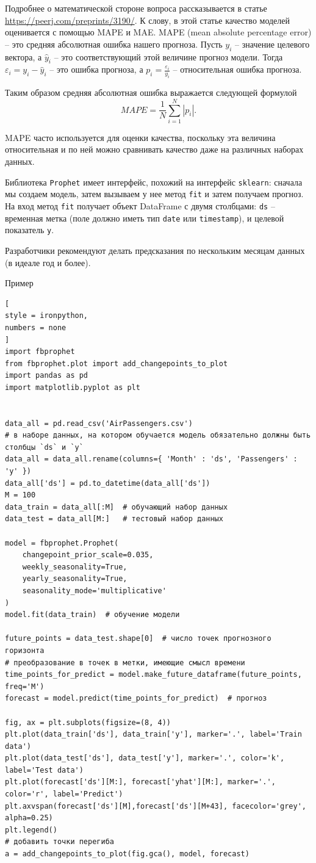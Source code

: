 \documentclass[%
	11pt,
	a4paper,
	utf8,
		]{article}
\begin{document}
Подробнее о математической стороне вопроса рассказывается в статье \url{https://peerj.com/preprints/3190/}. К слову, в этой статье качество моделей оценивается с помощью MAPE и MAE. MAPE (mean absolute percentage error) -- это средняя абсолютная ошибка нашего прогноза. Пусть $ y_i $ -- значение целевого вектора, а $ \hat{y}_i $ -- это соответствующий этой величине прогноз модели. Тогда $ \varepsilon_i = y_i - \hat{y}_i $ -- это ошибка прогноза, а $ p_i = \frac{\varepsilon_i}{y_i} $ -- относительная ошибка прогноза.

Таким образом средняя абсолютная ошибка выражается следующей формулой
$$
MAPE = \frac{1}{N}\sum_{i = 1}^{N} |p_i|.
$$

MAPE часто используется для оценки качества, поскольку эта величина относительная и по ней можно сравнивать качество даже на различных наборах данных.

Библиотека \texttt{Prophet} имеет интерфейс, похожий на интерфейс \texttt{sklearn}: сначала мы создаем модель, затем вызываем у нее метод \texttt{fit} и затем получаем прогноз. На вход метод \texttt{fit} получает объект DataFrame с двумя столбцами: \texttt{ds} -- временная метка (поле должно иметь тип \texttt{date} или \texttt{timestamp}), и целевой показатель \texttt{y}.

Разработчики рекомендуют делать предсказания по нескольким месяцам данных (в идеале год и более).

Пример
\begin{lstlisting}[
style = ironpython,
numbers = none
]
import fbprophet
from fbprophet.plot import add_changepoints_to_plot
import pandas as pd
import matplotlib.pyplot as plt


data_all = pd.read_csv('AirPassengers.csv')
# в наборе данных, на котором обучается модель обязательно должны быть столбцы `ds` и `y`
data_all = data_all.rename(columns={ 'Month' : 'ds', 'Passengers' : 'y' })
data_all['ds'] = pd.to_datetime(data_all['ds'])
M = 100
data_train = data_all[:M]  # обучающий набор данных
data_test = data_all[M:]   # тестовый набор данных

model = fbprophet.Prophet(
    changepoint_prior_scale=0.035,
    weekly_seasonality=True,
    yearly_seasonality=True,
    seasonality_mode='multiplicative'
)
model.fit(data_train)  # обучение модели

future_points = data_test.shape[0]  # число точек прогнозного горизонта
# преобразование в точек в метки, имеющие смысл времени
time_points_for_predict = model.make_future_dataframe(future_points, freq='M')
forecast = model.predict(time_points_for_predict)  # прогноз

fig, ax = plt.subplots(figsize=(8, 4))
plt.plot(data_train['ds'], data_train['y'], marker='.', label='Train data')
plt.plot(data_test['ds'], data_test['y'], marker='.', color='k', label='Test data')
plt.plot(forecast['ds'][M:], forecast['yhat'][M:], marker='.', color='r', label='Predict')
plt.axvspan(forecast['ds'][M],forecast['ds'][M+43], facecolor='grey', alpha=0.25)
plt.legend()
# добавить точки перегиба
a = add_changepoints_to_plot(fig.gca(), model, forecast)
\end{lstlisting}
\end{document}
